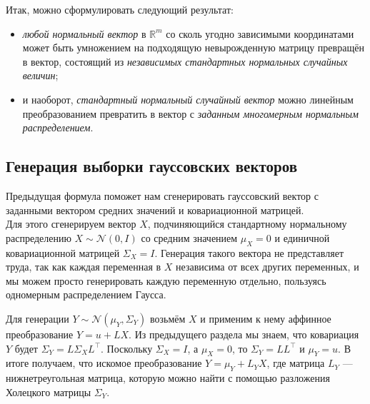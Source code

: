 \documentclass[11pt,a4paper]{article}
\providecommand{\tightlist}{%
      \setlength{\itemsep}{0pt}\setlength{\parskip}{0pt}}
\begin{document}
    Итак, можно сформулировать следующий результат:

\begin{itemize}
\tightlist
\item
  \emph{любой нормальный вектор} в \(\mathbb{R}^m\) со сколь угодно
  зависимыми координатами может быть умножением на подходящую
  невырожденную матрицу превращён в вектор, состоящий из
  \emph{независимых стандартных нормальных случайных величин};
\item
  и наоборот, \emph{стандартный нормальный случайный вектор} можно
  линейным преобразованием превратить в вектор с \emph{заданным
  многомерным нормальным распределением}.
\end{itemize}

    \hypertarget{ux433ux435ux43dux435ux440ux430ux446ux438ux44f-ux432ux44bux431ux43eux440ux43aux438-ux433ux430ux443ux441ux441ux43eux432ux441ux43aux438ux445-ux432ux435ux43aux442ux43eux440ux43eux432}{%
\subsection{Генерация выборки гауссовских
векторов}\label{ux433ux435ux43dux435ux440ux430ux446ux438ux44f-ux432ux44bux431ux43eux440ux43aux438-ux433ux430ux443ux441ux441ux43eux432ux441ux43aux438ux445-ux432ux435ux43aux442ux43eux440ux43eux432}}

Предыдущая формула поможет нам сгенерировать гауссовский вектор с
заданными вектором средних значений и ковариационной матрицей.\\
Для этого сгенерируем вектор \(X\), подчиняющийся стандартному
нормальному распределению \(X \sim \mathcal{N}(0, I)\) со средним
значением \(\mu_{X} = 0\) и единичной ковариационной матрицей
\(\Sigma_{X} = I\). Генерация такого вектора не представляет труда, так
как каждая переменная в \(X\) независима от всех других переменных, и мы
можем просто генерировать каждую переменную отдельно, пользуясь
одномерным распределением Гаусса.

Для генерации \(Y \sim \mathcal{N}(\mu_{Y}, \Sigma_{Y})\) возьмём \(X\)
и применим к нему аффинное преобразование \(Y = u + LX\). Из предыдущего
раздела мы знаем, что ковариация \(Y\) будет
\(\Sigma_{Y} = L\Sigma_{X}L^\top\). Поскольку \(\Sigma_{X}=I\), а
\(\mu_{X} = 0\), то \(\Sigma_{Y} = L L^\top\) и \(\mu_{Y} = u\). В итоге
получаем, что искомое преобразование \(Y = \mu_{Y} + L_{Y}X\), где
матрица \(L_{Y}\) --- нижнетреугольная матрица, которую можно найти с
помощью разложения Холецкого матрицы \(\Sigma_{Y}\).
\end{document}
